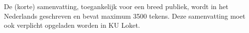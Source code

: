 De (korte) samenvatting, toegankelijk voor een breed publiek, wordt in het Nederlands geschreven en bevat maximum 3500 tekens. Deze samenvatting moet ook verplicht opgeladen worden in KU Loket.